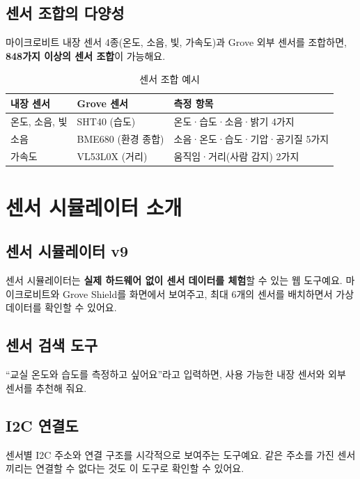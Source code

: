 \documentclass[11pt, a4paper]{article}
\begin{document}
\subsection{센서 조합의 다양성}

마이크로비트 내장 센서 4종(온도, 소음, 빛, 가속도)과 Grove 외부 센서를 조합하면, \textbf{848가지 이상의 센서 조합}이 가능해요.

\begin{table}[H]\centering
\caption{센서 조합 예시}
\begin{tabular}{lll}\toprule
\textbf{내장 센서} & \textbf{Grove 센서} & \textbf{측정 항목} \\\midrule
온도, 소음, 빛 & SHT40 (습도) & 온도·습도·소음·밝기 4가지 \\
소음 & BME680 (환경 종합) & 소음·온도·습도·기압·공기질 5가지 \\
가속도 & VL53L0X (거리) & 움직임·거리(사람 감지) 2가지 \\
\bottomrule
\end{tabular}
\end{table}

\section{센서 시뮬레이터 소개}

\subsection{센서 시뮬레이터 v9}

센서 시뮬레이터는 \textbf{실제 하드웨어 없이 센서 데이터를 체험}할 수 있는 웹 도구예요. 마이크로비트와 Grove Shield를 화면에서 보여주고, 최대 6개의 센서를 배치하면서 가상 데이터를 확인할 수 있어요.

\subsection{센서 검색 도구}

``교실 온도와 습도를 측정하고 싶어요''라고 입력하면, 사용 가능한 내장 센서와 외부 센서를 추천해 줘요.

\subsection{I2C 연결도}

센서별 I2C 주소와 연결 구조를 시각적으로 보여주는 도구예요. 같은 주소를 가진 센서끼리는 연결할 수 없다는 것도 이 도구로 확인할 수 있어요.
\end{document}

